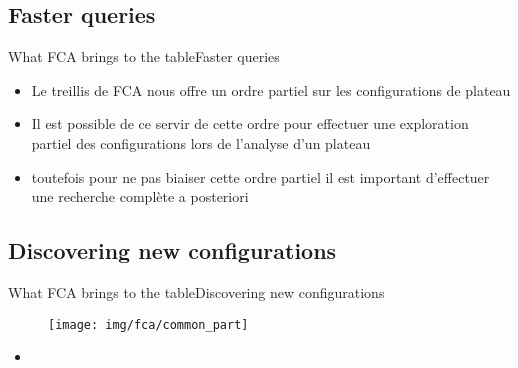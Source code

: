 \subsection{Faster queries}
\begin{frame}{What FCA brings to the table}{Faster queries}


  \begin{itemize}
    \item Le treillis de FCA nous offre un ordre partiel sur les
      configurations de plateau
    \item Il est possible de ce servir de cette ordre pour effectuer
      une exploration partiel des configurations lors de l'analyse
      d'un plateau
    \item toutefois pour ne pas biaiser cette ordre partiel il est
      important d'effectuer une recherche complète a posteriori
    
  \end{itemize}



\end{frame}

%
\subsection{Discovering new configurations}
\begin{frame}{What FCA brings to the table}{Discovering new
    configurations}

\begin{minipage}[t]{0.40\linewidth}
  \begin{figure}[ht]
    \centering
    \texttt{[image: img/fca/common\_part]}
  \end{figure}
\end{minipage}
\begin{minipage}{0.60\linewidth}
  \begin{itemize}
    \item 
  \end{itemize}
\end{minipage}

\end{frame}


